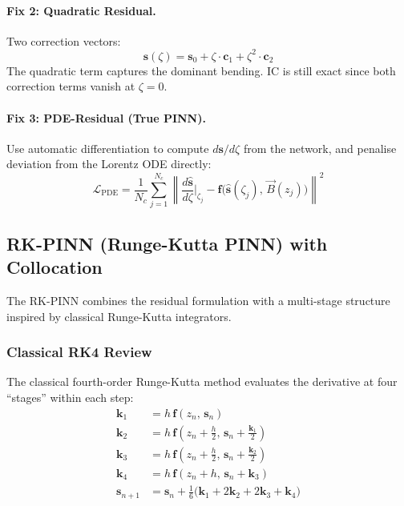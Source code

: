\documentclass[11pt,a4paper]{article}
\newcommand{\zfrac}{\zeta}
\newcommand{\vstate}{\mathbf{s}}
\newcommand{\vc}{\mathbf{c}}
\newcommand{\vB}{\vec{B}}
\begin{document}
\paragraph{Fix 2: Quadratic Residual.}
Two correction vectors:
\begin{equation}\label{eq:quadratic}
  \vstate(\zfrac) = \vstate_0 + \zfrac\cdot\vc_1 + \zfrac^2\cdot\vc_2
\end{equation}
\noindent The quadratic term captures the dominant bending.  IC is still
exact since both correction terms vanish at $\zfrac=0$.

\paragraph{Fix 3: PDE-Residual (True PINN).}
Use automatic differentiation to compute $d\vstate/d\zfrac$ from the
network, and penalise deviation from the Lorentz ODE directly:
\begin{equation}\label{eq:pde_loss}
  \mathcal{L}_{\mathrm{PDE}} = \frac{1}{N_c}\sum_{j=1}^{N_c}
  \left\|\frac{d\hat{\vstate}}{d\zfrac}\bigg|_{\zfrac_j}
  - \mathbf{f}\bigl(\hat{\vstate}(\zfrac_j),\,\vB(z_j)\bigr)\right\|^2
\end{equation}

\subsection{RK-PINN (Runge-Kutta PINN) with Collocation}\label{sec:rkpinn}

The RK-PINN combines the residual formulation with a multi-stage structure
inspired by classical Runge-Kutta integrators.

\subsubsection{Classical RK4 Review}

The classical fourth-order Runge-Kutta method evaluates the derivative at
four ``stages'' within each step:
\begin{equation}\label{eq:rk4}
\begin{aligned}
  \mathbf{k}_1 &= h\,\mathbf{f}(z_n,\,\vstate_n) \\
  \mathbf{k}_2 &= h\,\mathbf{f}\!\left(z_n+\tfrac{h}{2},\,
    \vstate_n+\tfrac{\mathbf{k}_1}{2}\right) \\
  \mathbf{k}_3 &= h\,\mathbf{f}\!\left(z_n+\tfrac{h}{2},\,
    \vstate_n+\tfrac{\mathbf{k}_2}{2}\right) \\
  \mathbf{k}_4 &= h\,\mathbf{f}(z_n+h,\,\vstate_n+\mathbf{k}_3) \\[4pt]
  \vstate_{n+1} &= \vstate_n
    + \tfrac{1}{6}\bigl(\mathbf{k}_1 + 2\mathbf{k}_2
    + 2\mathbf{k}_3 + \mathbf{k}_4\bigr)
\end{aligned}
\end{equation}
\end{document}

